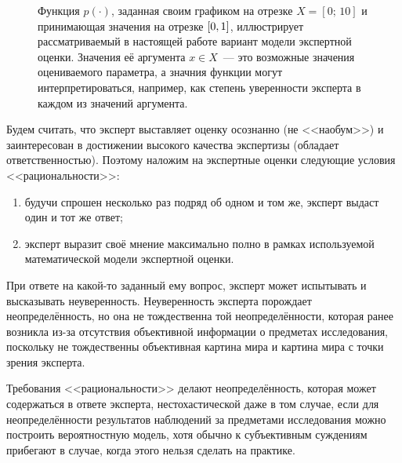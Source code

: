 \begin{figure}[h!]
\caption{\small Функция $p(\cdot)$, заданная своим графиком на отрезке $X = [0;\,10]$ и принимающая значения на отрезке $[0,1]$, иллюстрирует рассматриваемый в настоящей работе вариант модели экспертной оценки. Значения её аргумента $x \in X$~--- это возможные значения оцениваемого параметра, а значния функции могут интерпретироваться, например, как степень уверенности эксперта в каждом из значений аргумента. }
\label{ris:fuzzy_number_intro}
\end{figure}

Будем считать, что эксперт выставляет оценку осознанно (не <<наобум>>) и заинтересован в достижении высокого качества экспертизы (обладает ответственностью). Поэтому наложим на экспертные оценки следующие условия <<рациональности>>:
\begin{enumerate}
 \item будучи спрошен несколько раз подряд об одном и том же, эксперт выдаст один и тот же ответ; 
 \item эксперт выразит своё мнение максимально полно в рамках используемой математической модели экспертной оценки.
\end{enumerate}

При ответе на какой-то заданный ему вопрос, эксперт может испытывать и высказывать неуверенность. Неуверенность эксперта  порождает неопределённость, но она не тождественна той неопределённости, которая ранее возникла из-за отсутствия объективной информации о предметах исследования, поскольку не тождественны объективная картина мира и картина мира с точки зрения эксперта. 

Требования <<рациональности>> делают неопределённость, которая может содержаться в ответе эксперта, нестохастической даже в том случае, если для неопределённости результатов наблюдений за предметами исследования можно построить вероятностную модель, хотя обычно к субъективным суждениям прибегают в случае, когда этого нельзя сделать на практике. 

